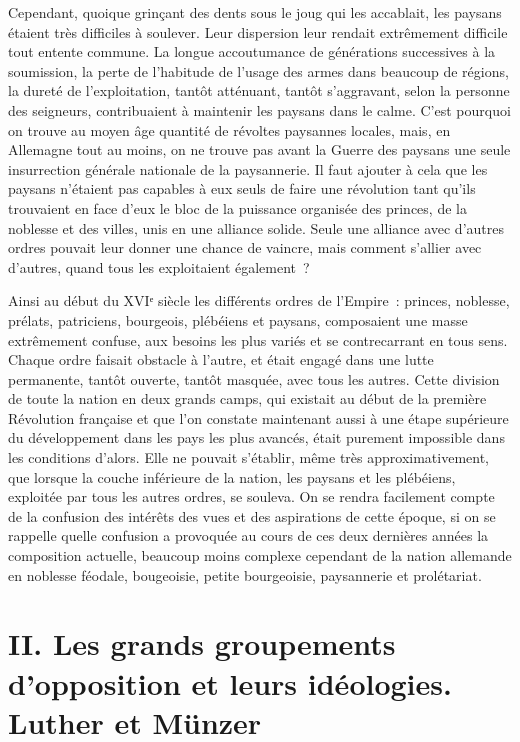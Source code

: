 \documentclass[french,twoside]{book} %
\newcommand\chapteropen{} %
\newcommand\chapterclose{} %
\begin{document}
Cependant, quoique grinçant des dents sous le joug qui les accablait, les paysans étaient très difficiles à soulever. Leur dispersion leur rendait extrêmement difficile tout entente commune. La longue accoutumance de générations successives à la soumission, la perte de l’habitude de l’usage des armes dans beaucoup de régions, la dureté de l’exploitation, tantôt atténuant, tantôt s’aggravant, selon la personne des seigneurs, contribuaient à maintenir les paysans dans le calme. C’est pourquoi on trouve au moyen âge quantité de révoltes paysannes locales, mais, en Allemagne tout au moins, on ne trouve pas avant la Guerre des paysans une seule insurrection générale nationale de la paysannerie. Il faut ajouter à cela que les paysans n’étaient pas capables à eux seuls de faire une révolution tant qu’ils trouvaient en face d’eux le bloc de la puissance organisée des princes, de la noblesse et des villes, unis en une alliance solide. Seule une alliance avec d’autres ordres pouvait leur donner une chance de vaincre, mais comment s’allier avec d’autres, quand tous les exploitaient également ?\par
Ainsi au début du XVIᵉ siècle les différents ordres de l’Empire : princes, noblesse, prélats, patriciens, bourgeois, plébéiens et paysans, composaient une masse extrêmement confuse, aux besoins les plus variés et se contrecarrant en tous sens. Chaque ordre faisait obstacle à l’autre, et était engagé dans une lutte permanente, tantôt ouverte, tantôt masquée, avec tous les autres. Cette division de toute la nation en deux grands camps, qui existait au début de la première Révolution française et que l’on constate maintenant aussi à une étape supérieure du développement dans les pays les plus avancés, était purement impossible dans les conditions d’alors. Elle ne pouvait s’établir, même très approximativement, que lorsque la couche inférieure de la nation, les paysans et les plébéiens, exploitée par tous les autres ordres, se souleva. On se rendra facilement compte de la confusion des intérêts des vues et des aspirations de cette époque, si on se rappelle quelle confusion a provoquée au cours de ces deux dernières années la composition actuelle, beaucoup moins complexe cependant de la nation allemande en noblesse féodale, bougeoisie, petite bourgeoisie, paysannerie et prolétariat.
\chapterclose


\chapteropen
\chapter[{II. Les grands groupements d’opposition et leurs idéologies. Luther et Münzer}]{II. Les grands groupements d’opposition et leurs idéologies. Luther et Münzer }\renewcommand{\leftmark}{II. Les grands groupements d’opposition et leurs idéologies. Luther et Münzer }
\end{document}
